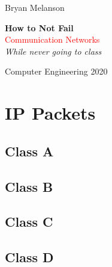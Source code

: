 \documentclass[11pt]{article}
\newcommand*{\plogo}{\fbox{$\mathcal{BM}$}}
\begin{document}
 
        
    \begin{titlepage}
    
        \raggedleft
        
        \vspace*{\baselineskip}
        
        {\Large Bryan Melanson}
        
        \vspace*{0.167\textheight}
        
        \textbf{\LARGE How to Not Fail}\\[\baselineskip]
        
        {\textcolor{Red}{\Huge Communication Networks}}\\[\baselineskip]
        
        {\Large \textit{While never going to class}}
        
        \vfill
        
        {\large Computer Engineering 2020 ~~\plogo}
        
        \vspace*{3\baselineskip}
    
    \end{titlepage}

    \pagebreak
    
    
    \tableofcontents


\section{IP Packets}

\subsection{Class A}
\subsection{Class B}
\subsection{Class C}
\subsection{Class D} 
\end{document}
